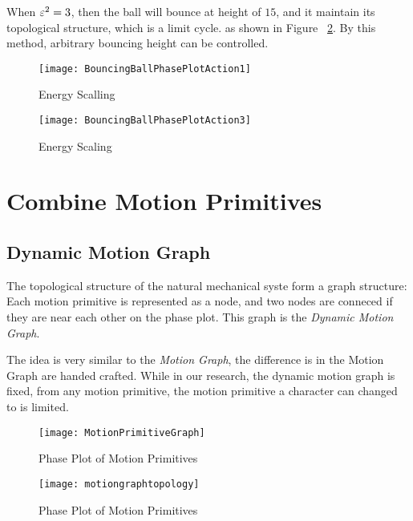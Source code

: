 When $\varepsilon^2=3$, then the ball will bounce at height of $15$, and it maintain its topological structure, which is a limit cycle.
as shown in Figure ~\ref{fig:energy3}. 
By this method, arbitrary bouncing height can be controlled.


\begin{figure}[!htbp]
  \begin{center}
   	\texttt{[image: BouncingBallPhasePlotAction1]}
    \caption{Energy Scalling}
    \label{fig:energy1}
  \end{center}
\end{figure} 


\begin{figure}[!htbp]
  \begin{center}
	\texttt{[image: BouncingBallPhasePlotAction3]}
    \caption{Energy Scaling}
    \label{fig:energy3}
  \end{center}
\end{figure}

\section{Combine Motion Primitives}

\subsection{Dynamic Motion Graph}
The topological structure of the natural mechanical syste form a graph structure:
Each motion primitive is represented as a node, and two nodes are conneced if they are near each other on the phase plot.
This graph is the \emph{Dynamic Motion Graph}.

The idea is very similar to the \emph{Motion Graph}\citep{kovar2008motion}, the difference is in the  Motion Graph are handed crafted.
While in our research,  the dynamic motion graph is fixed, from any motion primitive, the motion primitive a character can changed to is limited.

\begin{figure}[!htbp]
  \begin{center}
	\texttt{[image: MotionPrimitiveGraph]}
    \caption{Phase Plot of Motion Primitives}
    \label{fig:manyprimitives}
  \end{center}
\end{figure}


\begin{figure}[!htbp]
  \begin{center}
      \texttt{[image: motiongraphtopology]}
    \caption{Phase Plot of Motion Primitives}
    \label{fig:manyprimitives}
  \end{center}
\end{figure}


